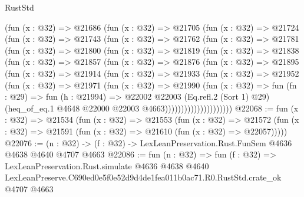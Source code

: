 \begin{lexlean}{RustStd}
\begin{coremodule}
        (fun (x : @32) =>
        @21686
          (fun (x : @32) =>
          @21705
            (fun (x : @32) =>
            @21724
              (fun (x : @32) =>
              @21743
                (fun (x : @32) =>
                @21762
                  (fun (x : @32) =>
                  @21781
                    (fun (x : @32) =>
                    @21800
                      (fun (x : @32) =>
                      @21819
                        (fun (x : @32) =>
                        @21838
                          (fun (x : @32) =>
                          @21857
                            (fun (x : @32) =>
                            @21876
                              (fun (x : @32) =>
                              @21895
                                (fun (x : @32) =>
                                @21914
                                  (fun (x : @32) =>
                                  @21933
                                    (fun (x : @32) =>
                                    @21952
                                      (fun (x : @32) =>
                                      @21971
                                        (fun (x : @32) =>
                                        @21990
                                          (fun (x : @32) =>
                                          fun (fn : @29) =>
                                          fun (h : @21994) =>
                                          @22002
                                            @22003
                                            (Eq.refl.{2} (Sort 1) @29)
                                            (heq_of_eq.{1}
                                              @4648
                                              @22000
                                              @22003
                                              @4663)))))))))))))))))))))
@22068 := fun (x : @32) =>
  @21534
    (fun (x : @32) =>
    @21553
      (fun (x : @32) =>
      @21572 (fun (x : @32) => @21591 (fun (x : @32) => @21610 (fun (x : @32) => @22057)))))
@22076 := (n : @32) -> (f : @32) -> LexLeanPreservation.Rust.FunSem @4636 @4638 @4640 @4707 @4663
@22086 := fun (n : @32) =>
  fun (f : @32) =>
  LexLeanPreservation.Rust.simulate
    @4636
    @4638
    @4640
    LexLeanPreserve.C690ed0e5f0e52d9d4de1fea011b0ac71.R0.RustStd.crate_ok
    @4707
    @4663
\end{coremodule}
\end{lexlean}
